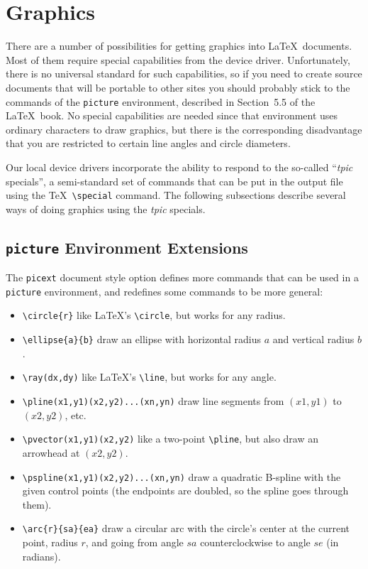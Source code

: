 \section{Graphics}

There are a number of possibilities for getting graphics into
\LaTeX\ documents.
Most of them require special capabilities from
the device driver.
Unfortunately, there is no universal standard for such capabilities,
so if you need to create source documents that will be portable to
other sites you should probably stick to the commands of the
\verb|picture| environment, described in
Section~5.5 of the \LaTeX\ book.
No special capabilities are needed since that environment
uses ordinary characters to draw graphics,
but there is the corresponding disadvantage that you are
restricted to certain line angles and circle diameters.

Our local device drivers incorporate the ability to respond to the so-called
``{\em tpic\/} specials'', a semi-standard set of commands that can
be put in the output file using the \TeX\ \verb|\special| command.
The following subsections describe several ways of doing graphics
using the {\em tpic\/} specials.

\subsection{{\tt picture} Environment Extensions}

The \verb|picext| document style option defines more commands that can
be used in a \verb|picture| environment, and redefines some commands
to be more general:
\begin{itemize}
\item[] \hbox{\verb|\circle{r}|}
	like \LaTeX's \verb|\circle|, but works for any radius.
\item[] \hbox{\verb|\ellipse{a}{b}|}
	draw an ellipse with horizontal radius $a$ and vertical radius $b$.
\item[] \hbox{\verb|\ray(dx,dy)|}
	like \LaTeX's \verb|\line|, but works for any angle.
\item[] \hbox{\verb|\pline(x1,y1)(x2,y2)...(xn,yn)|}
	draw line segments from $(x1,y1)$ to $(x2,y2)$, etc.
\item[] \hbox{\verb|\pvector(x1,y1)(x2,y2)|}
	like a two-point \verb|\pline|, but also draw an arrowhead at $(x2,y2)$.
\item[] \hbox{\verb|\pspline(x1,y1)(x2,y2)...(xn,yn)|}
	draw a quadratic B-spline with the given control points
	(the endpoints are doubled, so the spline goes through them).
\item[] \hbox{\verb|\arc{r}{sa}{ea}|}
	draw a circular arc with the circle's center at the current
	point, radius $r$, and going from angle
	$sa$ counterclockwise to angle $se$ (in radians).
\end{itemize}

